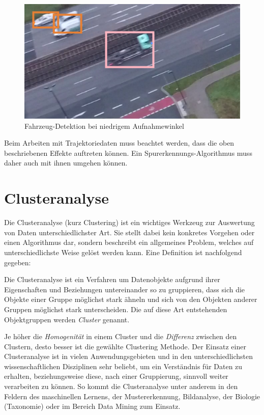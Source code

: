 \begin{figure}[H]
    \centering
    \includegraphics[width=0.45\linewidth]{resources/img/grundlagen/TrajectoryReconstruction/challenges/low_angle}
    \caption{Fahrzeug-Detektion bei niedrigem Aufnahmewinkel}
    \label{fig:grund_low_angle_detection}
\end{figure}

Beim Arbeiten mit Trajektoriedaten muss beachtet werden, dass die oben beschriebenen Effekte auftreten
können. Ein Spurerkennungs-Algorithmus muss daher auch mit ihnen umgehen können.

\chapter{Clusteranalyse}
\label{sec:tra_clustering}

Die Clusteranalyse (kurz Clustering) ist ein wichtiges Werkzeug zur Auswertung von Daten unterschiedlichster
Art. Sie stellt dabei kein konkretes Vorgehen oder einen Algorithmus dar, sondern beschreibt ein
allgemeines Problem, welches auf unterschiedlichste Weise gelöst werden kann. Eine Definition ist nachfolgend
gegeben:

\begin{theorem}[Clusteranalyse]
    Die Clusteranalyse ist ein Verfahren um Datenobjekte aufgrund ihrer Eigenschaften und Beziehungen
    untereinander so zu gruppieren, dass sich die Objekte einer Gruppe möglichst stark ähneln und sich
    von den Objekten anderer Gruppen möglichst stark unterscheiden. Die auf diese Art entstehenden
    Objektgruppen werden \textit{Cluster} genannt.
\end{theorem}

Je höher die \textit{Homogenität} in einem Cluster
und die \textit{Differenz} zwischen den Clustern, desto besser ist die gewählte Clustering Methode.
Der Einsatz einer Clusteranalyse ist in vielen Anwendungsgebieten und in den unterschiedlichsten wissenschaftlichen
Disziplinen sehr beliebt, um ein Verständnis für Daten zu erhalten, beziehungsweise diese, nach einer Gruppierung,
sinnvoll weiter verarbeiten zu können.
So kommt die Clusteranalyse unter anderem in den Feldern des maschinellen Lernens, der Mustererkennung, Bildanalyse,
der Biologie (Taxonomie) oder im Bereich Data Mining zum Einsatz. \cite[]{tan2007introduction}


